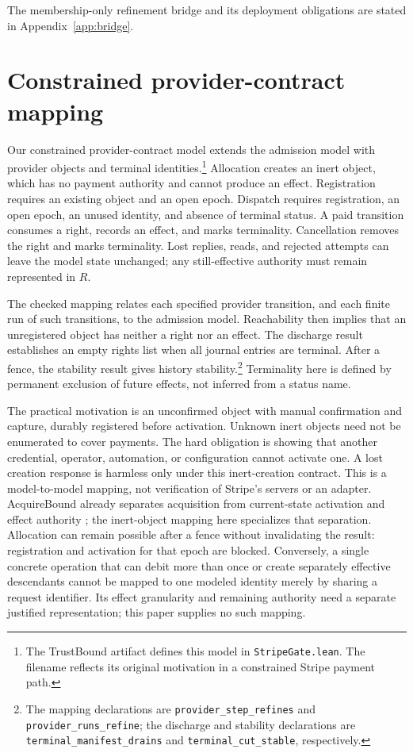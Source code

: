 \documentclass[letterpaper]{article}
\newcommand{\code}[1]{\texttt{#1}}
\begin{document}
The membership-only refinement bridge and its deployment obligations are stated in Appendix~\ref{app:bridge}.

\section{Constrained provider-contract mapping}
\label{sec:mapping}
Our constrained provider-contract model extends the admission model with
provider objects and terminal identities.\footnote{\raggedright The TrustBound artifact
defines this model in \code{StripeGate.lean}. The filename reflects its original
motivation in a constrained Stripe payment path.\par}
Allocation creates an inert object, which has no payment authority and cannot
produce an effect. Registration requires an existing object and an open epoch.
Dispatch requires registration, an open epoch, an unused identity, and absence
of terminal status. A paid transition consumes a right, records an effect,
and marks terminality. Cancellation removes the right and marks terminality.
Lost replies, reads, and rejected attempts can leave the model state unchanged;
any still-effective authority must remain represented in $R$.

The checked mapping relates each specified provider transition, and each finite
run of such transitions, to the admission model. Reachability then implies that
an unregistered object has neither a right nor an effect. The discharge result
establishes an empty rights list when all journal entries are terminal. After a
fence, the stability result gives history stability.\footnote{\raggedright The
mapping declarations are \code{provider\_step\_refines} and
\code{provider\_runs\_refine}; the discharge and stability declarations are
\code{terminal\_manifest\_drains} and \code{terminal\_cut\_stable}, respectively.\par}
Terminality here is defined by permanent exclusion of future effects, not
inferred from a status name.

The practical motivation is an unconfirmed object with manual confirmation
and capture, durably registered before activation. Unknown inert objects need
not be enumerated to cover payments. The hard obligation is showing that
another credential, operator, automation, or configuration cannot activate one.
A lost creation response is harmless only under this inert-creation contract.
This is a model-to-model mapping, not verification of Stripe's servers or an adapter. AcquireBound already
separates acquisition from current-state activation and effect authority
\citep{acquirebound}; the inert-object mapping here specializes that separation.
Allocation can remain possible after a fence without invalidating the result:
registration and activation for that epoch are blocked. Conversely, a single
concrete operation that can debit more than once or create separately effective
descendants cannot be mapped to one modeled identity merely by sharing a
request identifier. Its effect granularity and remaining authority need a
separate justified representation; this paper supplies no such mapping.
\end{document}
